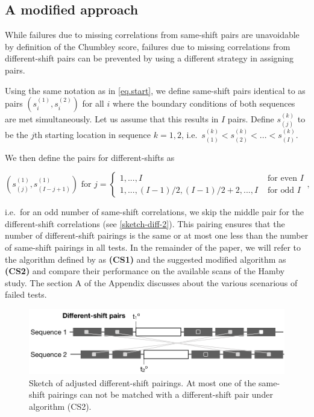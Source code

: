 \documentclass[12pt]{article}
\begin{document}
\subsection{A modified approach}\label{a-modified-approach}

While failures due to missing correlations from same-shift pairs are
unavoidable by definition of the Chumbley score, failures due to missing
correlations from different-shift pairs can be prevented by using a
different strategy in assigning pairs.

Using the same notation as in \autoref{eq.start}, we define same-shift
pairs identical to \citet{hadler} as pairs \((s_i^{(1)}, s_i^{(2)})\)
for all \(i\) where the boundary conditions of both sequences are met
simultaneously. Let us assume that this results in \(I\) pairs. Define
\(s_{(j)}^{(k)}\) to be the \(j\)th starting location in sequence
\(k = 1, 2\),
i.e.~\(s_{(1)}^{(k)} < s_{(2)}^{(k)} < ... < s_{(I)}^{(k)}\).

We then define the pairs for different-shifts as

\begin{equation}\label{eq.diff2}
\left(s_{(j)}^{(1)}, s_{(I-j+1)}^{(1)} \right) \text{ for } j = 
\begin{cases}
1, ..., I & \text{ for even } I \\
1, ..., (I-1)/2, (I-1)/2 + 2, ..., I & \text{ for odd } I
\end{cases},
\end{equation}

i.e.~for an odd number of same-shift correlations, we skip the middle
pair for the different-shift correlations (see \autoref{sketch-diff-2}).
This pairing ensures that the number of different-shift pairings is the
same or at most one less than the number of same-shift pairings in all
tests. In the remainder of the paper, we will refer to the algorithm
defined by \citet{hadler} as \textbf{(CS1)} and the suggested modified
algorithm as \textbf{(CS2)} and compare their performance on the
available scans of the Hamby study. The section  A %
of the Appendix discusses about the various scenarious of failed tests.

\begin{figure}[hbtp]
\centering
\includegraphics[width=.7\textwidth]{images/sketch-diff-2.png}
\caption{\label{sketch-diff-2}Sketch of adjusted different-shift pairings. At most one of the same-shift pairings can not be matched with a different-shift pair under algorithm (CS2). }
\end{figure}
\end{document}
